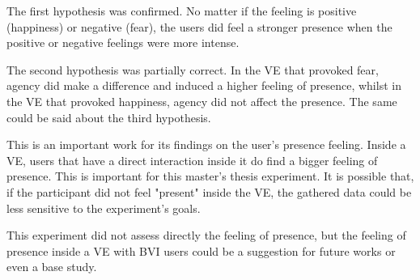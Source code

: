 The first hypothesis was confirmed. No matter if the feeling is positive (happiness) or negative (fear), the users did feel a stronger presence when the positive or negative feelings were more intense.

The second hypothesis was partially correct. In the VE that provoked fear, agency did make a difference and induced a higher feeling of presence, whilst in the VE that provoked happiness, agency did not affect the presence. The same could be said about the third hypothesis.

This is an important work for its findings on the user's presence feeling. Inside a VE, users that have a direct interaction inside it do find a bigger feeling of presence. This is important for this master's thesis experiment. It is possible that, if the participant did not feel "present" inside the VE, the gathered data could be less sensitive to the experiment's goals.

This experiment did not assess directly the feeling of presence, but the feeling of presence inside a VE with BVI users could be a suggestion for future works or even a base study.